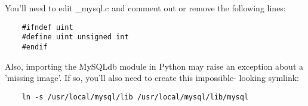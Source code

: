 You'll need to edit \_mysql.c and comment out or remove the following lines:

\begin{verbatim}
    #ifndef uint
    #define uint unsigned int
    #endif
\end{verbatim}

Also, importing the MySQLdb module in Python may raise an exception about
a 'missing image'. If so, you'll also need to create this impossible-
looking symlink:

\begin{verbatim}
    ln -s /usr/local/mysql/lib /usr/local/mysql/lib/mysql
\end{verbatim}

